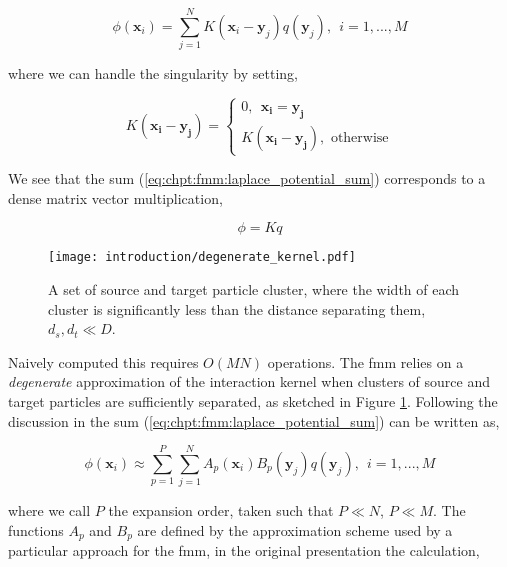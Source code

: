 \begin{equation}
    \phi(\mathbf{x}_i) = \sum_{j=1}^N K(\mathbf{x}_i-\mathbf{y}_j)q(\mathbf{y}_j), \> \> i = 1,...,M
    \label{eq:chpt:fmm:laplace_potential_sum}
\end{equation}

where we can handle the singularity by setting,

\begin{equation}
    K(\mathbf{x_i-y_j}) = \begin{cases}
        0, \> \> \mathbf{x_i=y_j} \\
        K(\mathbf{x_i-y_j}), \text{  otherwise}
    \end{cases}
\end{equation}


We see that the sum (\ref{eq:chpt:fmm:laplace_potential_sum}) corresponds to a dense matrix vector multiplication,

\begin{equation}
    \phi = K q
\end{equation}


\begin{figure}
    \centering
    \texttt{[image: introduction/degenerate\_kernel.pdf]}
    \caption{A set of source and target particle cluster, where the width of each cluster is significantly less than the distance separating them, $d_s, d_t \ll D$.}
    \label{fig:chpt:fmm:degenerate_kernel}
\end{figure}

Naively computed this requires $O(MN)$ operations. The \acrshort{fmm} relies on a \textit{degenerate} approximation of the interaction kernel when clusters of source and target particles are sufficiently separated, as sketched in Figure \ref{fig:chpt:fmm:degenerate_kernel}. Following the discussion in \cite{kailasa2024m2ltranslationoperatorskernel} the sum (\ref{eq:chpt:fmm:laplace_potential_sum}) can be written as,

\begin{equation}
    \phi(\mathbf{x}_i) \approx \sum_{p=1}^P \sum_{j=1}^N A_p(\mathbf{x}_i) B_p(\mathbf{y}_j)q(\mathbf{y}_j), \> \> i = 1,...,M
    \label{eq:chpt:introduction:sec:motivation:degenerate_kernel}
\end{equation}

where we call $P$ the expansion order, taken such that $P \ll N$, $P \ll M$. The functions $A_p$ and $B_p$ are defined by the approximation scheme used by a particular approach for the \acrshort{fmm}, in the original presentation the calculation,

